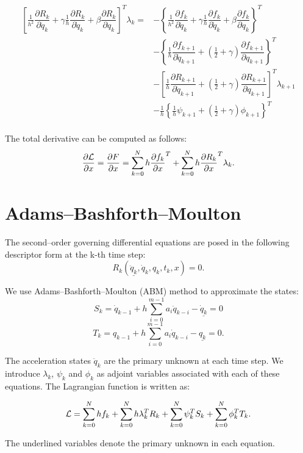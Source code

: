 \documentclass[10pt,letter]{book}
\newcommand{\pd}[2]{\dfrac{\partial #1}{\partial #2}}
\begin{document}
     \begin{equation}
       \begin{split}
         \left[ \frac{1}{h^2} \pd{R_k}{\ddot{q}_k} + \gamma \frac{1}{h} \pd{R_k}{\dot{q}_k} + \beta \pd{R_k}{{q}_k} \right]^T \lambda_k = &- \left\{ \frac{1}{h^2}  \pd{f_k}{\ddot{q}_k} + \gamma \frac{1}{h} \pd{f_k}{\dot{q}_k} + \beta \pd{f_k}{{q}_k} \right\}^T \\
         & -  \left\{  \frac{1}{h} \pd{f_{k+1}}{\dot{q}_{k+1}} +  (\frac{1}{2} +\gamma) \pd{f_{k+1}}{{q}_{k+1}} \right\}^T \\
         & -  \left[  \frac{1}{h} \pd{R_{k+1}}{\dot{q}_{k+1}} +  (\frac{1}{2} +\gamma)  \pd{R_{k+1}}{{q}_{k+1}} \right]^T\lambda_{k+1} \\
         & -  \frac{1}{h} \left\{ \frac{1}{h} \psi_{k+1} + (\frac{1}{2} +\gamma) \phi_{k+1} \right\}^T\\
       \end{split}
     \end{equation}

     The total derivative can be computed as follows:
     $$\pd{\cal{L}}{x} = \pd{F}{x} = \sum_{k=0}^N h \pd{f_k}{x}^T + \sum_{k=0}^N h
     \pd{R_k}{x}^T \lambda_k.$$

     \section{Adams--Bashforth--Moulton}

     The second--order governing differential equations are posed in the following
     descriptor form at the k-th time step:
     $$ R_k(\underline{\ddot{q}_k}, \dot{q}_k, q_k, t_k , x) = 0.$$

     We use Adams--Bashforth--Moulton (ABM) method to approximate the states:
     $$ S_k =   \dot{q}_{k-1}  + h \sum_{i=0}^{m-1} a_i \ddot{q}_{k-i} - \underline{\dot{q}_k}  = 0 $$ 
     $$ T_k =   {q}_{k-1}  + h \sum_{i=0}^{m-1} a_i \dot{q}_{k-i} - \underline{{q}_k} = 0.$$

     The acceleration states $\ddot{q}_k$ are the primary unknown at each time step. We introduce $\lambda_k$, $\psi_k$ and $\phi_k$ as adjoint variables
     associated with each of these equations. The Lagrangian function is written
     as:

     $${\cal{L}} = \sum_{k=0}^N h f_k + \sum_{k=0}^N h \lambda_k^T
     R_k + \sum_{k=0}^N \psi_k^T S_k + \sum_{k=0}^N \phi_k^T T_k. $$

     The underlined variables denote the primary unknown in each
     equation.
     
\end{document}

